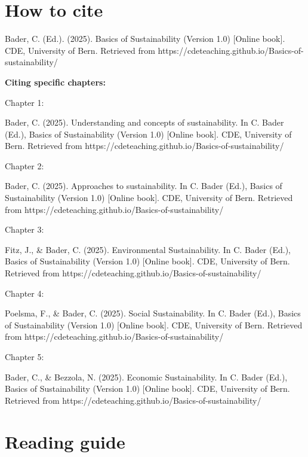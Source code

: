 \documentclass[
  a4paper,
  openany]{book}
\begin{document}
\section*{How to cite}\label{how-to-cite}


Bader, C. (Ed.). (2025). Basics of Sustainability (Version 1.0)
{[}Online book{]}. CDE, University of Bern. Retrieved from
https://cdeteaching.github.io/Basics-of-sustainability/

\textbf{Citing specific chapters:}

Chapter 1:

Bader, C. (2025). Understanding and concepts of sustainability. In C.
Bader (Ed.), Basics of Sustainability (Version 1.0) {[}Online book{]}.
CDE, University of Bern. Retrieved from
https://cdeteaching.github.io/Basics-of-sustainability/

Chapter 2:

Bader, C. (2025). Approaches to sustainability. In C. Bader (Ed.),
Basics of Sustainability (Version 1.0) {[}Online book{]}. CDE,
University of Bern. Retrieved from
https://cdeteaching.github.io/Basics-of-sustainability/

Chapter 3:

Fitz, J., \& Bader, C. (2025). Environmental Sustainability. In C. Bader
(Ed.), Basics of Sustainability (Version 1.0) {[}Online book{]}. CDE,
University of Bern. Retrieved from
https://cdeteaching.github.io/Basics-of-sustainability/

Chapter 4:

Poelsma, F., \& Bader, C. (2025). Social Sustainability. In C. Bader
(Ed.), Basics of Sustainability (Version 1.0) {[}Online book{]}. CDE,
University of Bern. Retrieved from
https://cdeteaching.github.io/Basics-of-sustainability/

Chapter 5:

Bader, C., \& Bezzola, N. (2025). Economic Sustainability. In C. Bader
(Ed.), Basics of Sustainability (Version 1.0) {[}Online book{]}. CDE,
University of Bern. Retrieved from
https://cdeteaching.github.io/Basics-of-sustainability/

\section*{Reading guide}\label{reading-guide}

\end{document}
